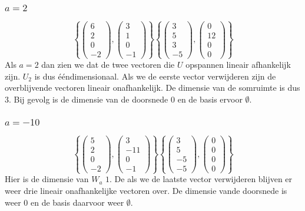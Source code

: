 \documentclass[lineaire_algebra_oplossingen.tex]{subfiles}
\begin{document}
\subsubsection*{$a = 2$}
\[
\left\lbrace
\begin{pmatrix}
6\\2\\0\\-2
\end{pmatrix}
,
\begin{pmatrix}
3\\1\\0\\-1
\end{pmatrix}
\right\rbrace
\left\lbrace
\begin{pmatrix}
3\\5\\3\\-5
\end{pmatrix}
,
\begin{pmatrix}
0\\12\\0\\0
\end{pmatrix}
\right\rbrace
\]
Als $a=2$ dan zien we dat de twee vectoren die $U$ opspannen lineair afhankelijk zijn. $U_2$ is dus \'e\'endimensionaal. Als we de eerste vector verwijderen zijn de overblijvende vectoren lineair onafhankelijk. De dimensie van de somruimte is dus $3$. Bij gevolg is de dimensie van de doorsnede $0$ en de basis ervoor $\emptyset$.
\subsubsection*{$a=-10$}
\[
\left\lbrace
\begin{pmatrix}
5\\2\\0\\-2
\end{pmatrix}
,
\begin{pmatrix}
3\\-11\\0\\-1
\end{pmatrix}
\right\rbrace
\left\lbrace
\begin{pmatrix}
3\\5\\-5\\-5
\end{pmatrix}
,
\begin{pmatrix}
0\\0\\0\\0
\end{pmatrix}
\right\rbrace
\]
Hier is de dimensie van $W_a$ $1$. De als we de laatste vector verwijderen blijven er weer drie lineair onafhankelijke vectoren over. De dimensie vande doorsnede is weer $0$ en de basis daarvoor weer $\emptyset$.
\end{document}
